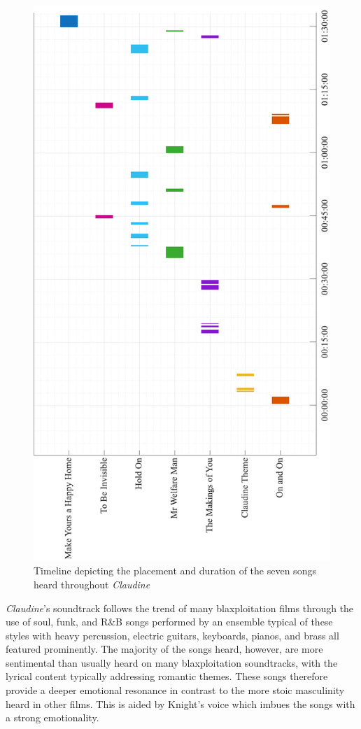 \begin{figure}[h!]
    \centering
    \includegraphics[width=0.75\linewidth]{img/claudine-timeline-songs.pdf}
    \caption{Timeline depicting the placement and duration of the seven songs heard throughout \textit{Claudine}}
    \label{fig:claudine-timeline-songs}
\end{figure}


\textit{Claudine}'s soundtrack follows the trend of many blaxploitation films through the use of soul, funk, and R\&B songs performed by an ensemble typical of these styles with heavy percussion, electric guitars, keyboards, pianos, and brass all featured prominently.
The majority of the songs heard, however, are more sentimental than usually heard on many blaxploitation soundtracks, with the lyrical content typically addressing romantic themes.
These songs therefore provide a deeper emotional resonance in contrast to the more stoic masculinity heard in other films.
This is aided by Knight's voice which imbues the songs with a strong emotionality.

